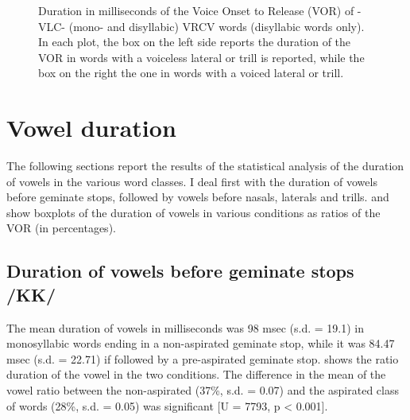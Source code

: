 \documentclass[11pt,a4paper,oneside,openany]{memoir}\usepackage[]{graphicx}\usepackage[]{color}
\newenvironment{knitrout}{}{} %
\begin{document}
\begin{figure}
\begin{subfigure}{.5\textwidth}
\begin{knitrout}
\end{knitrout}
\end{subfigure}
\caption[Duration in milliseconds of the Voice Onset to Release (VOR) of -VLC- and VRCV words.]{Duration in milliseconds of the Voice Onset to Release (VOR) of -VLC- (mono- and disyllabic) VRCV words (disyllabic words only).
In each plot, the box on the left side reports the duration of the VOR in words with a voiceless lateral or trill is reported, while the box on the right the one in words with a voiced lateral or trill.}
\label{f:vor-rho}
\end{figure}


\section{Vowel duration}
\label{s:vow-dur}

The following sections report the results of the statistical analysis of the duration of vowels in the various word classes.
I deal first with the duration of vowels before geminate stops, followed by vowels before nasals, laterals and trills.
 and  show boxplots of the duration of vowels in various conditions as ratios of the VOR (in percentages).

\subsection{Duration of vowels before geminate stops /KK/}


The mean duration of vowels in milliseconds was 98 msec (s.d. = 19.1) in monosyllabic words ending in a non-aspirated geminate stop, while it was 84.47 msec (s.d. = 22.71) if followed by a pre-aspirated geminate stop.
 shows the ratio duration of the vowel in the two conditions.
The difference in the mean of the vowel ratio between the non-aspirated (37\%, s.d. = 0.07) and the aspirated class of words (28\%, s.d. = 0.05) was significant [U = 7793, p < 0.001].
\end{document}
